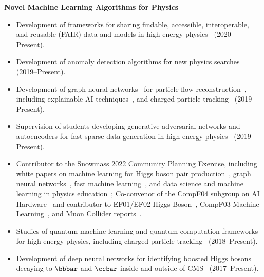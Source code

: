 \documentclass[11pt]{res}
\begin{document}
\begin{resume}
  \textbf{Novel Machine Learning Algorithms for Physics}
  \begin{itemize}
    \itemsep-0.3em
    \item Development of frameworks for sharing findable, accessible, interoperable, and reusable (FAIR) data and models in high energy physics~\cite{Huerta:2022kgj,Chen:2021euv} ({2020--Present}).
    \item Development of anomaly detection algorithms for new physics searches~\cite{Hao:2022zns,Govorkova:2021utb,Jawahar:2021vyu,Aarrestad:2021oeb,Tsan:2021brw,Kasieczka:2021xcg,Wozniak:2020} ({2019--Present}).
    \item Development of graph neural networks~\cite{Duarte:2020ngm} for particle-flow reconstruction~\cite{CMS-DP-2022-061,Pata:2022wam,CMS-DP-2021-030,Pata:2021oez}, including explainable AI techniques~\cite{Mokhtar:2022pwm,Mokhtar:2021bkf}, and charged particle tracking~\cite{Elabd:2021lgo,Dezoort:2021kfk,Heintz:2020soy} ({2019--Present}).
    \item Supervision of students developing generative adversarial networks and autoencoders for fast sparse data generation in high energy physics~\cite{Kansal:2022spb,Touranakou:2022qrp,Kansal:2021cqp,Orzari:2021suh,Kansal:2020svm} ({2019--Present}).
    \item Contributor to the Snowmass 2022 Community Planning Exercise, including white papers on machine learning for Higgs boson pair production~\cite{Apresyan:2022tqw}, graph neural networks~\cite{Thais:2022iok}, fast machine learning~\cite{Harris:2022qtm}, and data science and machine learning in physics education~\cite{Benelli:2022sqn}; Co-convenor of the CompF04 subgroup on AI Hardware~\cite{Bhimij:2022xyn} and contributor to EF01/EF02 Higgs Boson~\cite{Dawson:2022zbb}, CompF03 Machine Learning~\cite{Shanahan:2022ifi}, and Muon Collider reports~\cite{Black:2022cth}.
    \item Studies of quantum machine learning and quantum computation frameworks for high energy physics, including charged particle tracking~\cite{Zlokapa:2019tkn} ({2018--Present}).
    \item Development of deep neural networks for identifying boosted Higgs bosons decaying to $\bbbar$ and $\ccbar$ inside and outside of  CMS~\cite{Moreno:2019neq,Moreno:2019bmu,neurips2019_hbb,CMS-DP-2018-046} ({2017--Present}).
  \end{itemize}


\end{resume}
\end{document}
